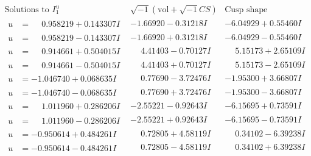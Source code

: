 \documentclass[1p]{elsarticle_modified}
\theoremstyle{definition}
\newcommand{\I}{\sqrt{-1}}
\begin{document}
$$\begin{array}{c|c|c}  
\text{Solutions to }I^u_{1}& \I (\text{vol} + \sqrt{-1}CS) & \text{Cusp shape}\\
 \hline 
\begin{aligned}
u &= \phantom{-}0.958219 + 0.143307 I\end{aligned}
 & -1.66920 - 0.31218 I & -6.04929 + 0.55460 I \\ \hline\begin{aligned}
u &= \phantom{-}0.958219 - 0.143307 I\end{aligned}
 & -1.66920 + 0.31218 I & -6.04929 - 0.55460 I \\ \hline\begin{aligned}
u &= \phantom{-}0.914661 + 0.504015 I\end{aligned}
 & \phantom{-}4.41403 - 0.70127 I & \phantom{-}5.15173 + 2.65109 I \\ \hline\begin{aligned}
u &= \phantom{-}0.914661 - 0.504015 I\end{aligned}
 & \phantom{-}4.41403 + 0.70127 I & \phantom{-}5.15173 - 2.65109 I \\ \hline\begin{aligned}
u &= -1.046740 + 0.068635 I\end{aligned}
 & \phantom{-}0.77690 - 3.72476 I & -1.95300 + 3.66807 I \\ \hline\begin{aligned}
u &= -1.046740 - 0.068635 I\end{aligned}
 & \phantom{-}0.77690 + 3.72476 I & -1.95300 - 3.66807 I \\ \hline\begin{aligned}
u &= \phantom{-}1.011960 + 0.286206 I\end{aligned}
 & -2.55221 - 0.92643 I & -6.15695 + 0.73591 I \\ \hline\begin{aligned}
u &= \phantom{-}1.011960 - 0.286206 I\end{aligned}
 & -2.55221 + 0.92643 I & -6.15695 - 0.73591 I \\ \hline\begin{aligned}
u &= -0.950614 + 0.484261 I\end{aligned}
 & \phantom{-}0.72805 + 4.58119 I & \phantom{-}0.34102 - 6.39238 I \\ \hline\begin{aligned}
u &= -0.950614 - 0.484261 I\end{aligned}
 & \phantom{-}0.72805 - 4.58119 I & \phantom{-}0.34102 + 6.39238 I \\ \hline\begin{aligned}

\end{aligned}
\end{array}$$
\end{document}
